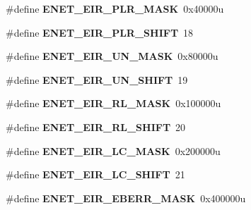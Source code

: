 \begin{DoxyCompactItemize}
\item 
\#define {\bfseries E\+N\+E\+T\+\_\+\+E\+I\+R\+\_\+\+P\+L\+R\+\_\+\+M\+A\+SK}~0x40000u\hypertarget{group__ENET__Register__Masks_ga23e353e0ca4a78c50becad48aa46c4ec}{}\label{group__ENET__Register__Masks_ga23e353e0ca4a78c50becad48aa46c4ec}

\item 
\#define {\bfseries E\+N\+E\+T\+\_\+\+E\+I\+R\+\_\+\+P\+L\+R\+\_\+\+S\+H\+I\+FT}~18\hypertarget{group__ENET__Register__Masks_gabdf57205ac58e2b4015341f739ee1150}{}\label{group__ENET__Register__Masks_gabdf57205ac58e2b4015341f739ee1150}

\item 
\#define {\bfseries E\+N\+E\+T\+\_\+\+E\+I\+R\+\_\+\+U\+N\+\_\+\+M\+A\+SK}~0x80000u\hypertarget{group__ENET__Register__Masks_ga6bcda0d283c8681a624a9486dc5aedd3}{}\label{group__ENET__Register__Masks_ga6bcda0d283c8681a624a9486dc5aedd3}

\item 
\#define {\bfseries E\+N\+E\+T\+\_\+\+E\+I\+R\+\_\+\+U\+N\+\_\+\+S\+H\+I\+FT}~19\hypertarget{group__ENET__Register__Masks_ga0fe318423bbdaea2e6d5731654850bc1}{}\label{group__ENET__Register__Masks_ga0fe318423bbdaea2e6d5731654850bc1}

\item 
\#define {\bfseries E\+N\+E\+T\+\_\+\+E\+I\+R\+\_\+\+R\+L\+\_\+\+M\+A\+SK}~0x100000u\hypertarget{group__ENET__Register__Masks_gaadac5817effd9bee22c9669a636d9f33}{}\label{group__ENET__Register__Masks_gaadac5817effd9bee22c9669a636d9f33}

\item 
\#define {\bfseries E\+N\+E\+T\+\_\+\+E\+I\+R\+\_\+\+R\+L\+\_\+\+S\+H\+I\+FT}~20\hypertarget{group__ENET__Register__Masks_gabcf1f78dde9d0ffc62f86c1098c3f1ff}{}\label{group__ENET__Register__Masks_gabcf1f78dde9d0ffc62f86c1098c3f1ff}

\item 
\#define {\bfseries E\+N\+E\+T\+\_\+\+E\+I\+R\+\_\+\+L\+C\+\_\+\+M\+A\+SK}~0x200000u\hypertarget{group__ENET__Register__Masks_gacdf52f6f451888ba1f10482ecc54c5ae}{}\label{group__ENET__Register__Masks_gacdf52f6f451888ba1f10482ecc54c5ae}

\item 
\#define {\bfseries E\+N\+E\+T\+\_\+\+E\+I\+R\+\_\+\+L\+C\+\_\+\+S\+H\+I\+FT}~21\hypertarget{group__ENET__Register__Masks_gac5df6240f71313895d446771dfbeec69}{}\label{group__ENET__Register__Masks_gac5df6240f71313895d446771dfbeec69}

\item 
\#define {\bfseries E\+N\+E\+T\+\_\+\+E\+I\+R\+\_\+\+E\+B\+E\+R\+R\+\_\+\+M\+A\+SK}~0x400000u\hypertarget{group__ENET__Register__Masks_ga3f96770a7d989e647572c6dfb8c512fc}{}\label{group__ENET__Register__Masks_ga3f96770a7d989e647572c6dfb8c512fc}


\end{DoxyCompactItemize}
